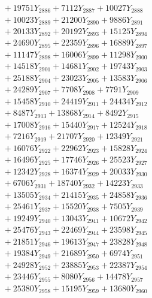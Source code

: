 \documentclass[a4paper,10pt]{article}
\begin{document}
{\begin{align}
&\;  + 19751 Y_{2886} + 7112 Y_{2887} + 10027 Y_{2888} \\[0.3ex]
&\;  + 10023 Y_{2889} + 21200 Y_{2890} + 9886 Y_{2891} \\[0.3ex]
&\;  + 20133 Y_{2892} + 20192 Y_{2893} + 15125 Y_{2894} \\[0.3ex]
&\;  + 24690 Y_{2895} + 22359 Y_{2896} + 16889 Y_{2897} \\[0.3ex]
&\;  + 11147 Y_{2898} + 16006 Y_{2899} + 11298 Y_{2900} \\[0.3ex]
&\;  + 14518 Y_{2901} + 14681 Y_{2902} + 19743 Y_{2903} \\[0.3ex]
&\;  + 25188 Y_{2904} + 23023 Y_{2905} + 13583 Y_{2906} \\[0.3ex]
&\;  + 24289 Y_{2907} + 7708 Y_{2908} + 7791 Y_{2909} \\[0.5ex]\allowbreak
&\;  + 15458 Y_{2910} + 24419 Y_{2911} + 24434 Y_{2912} \\[0.3ex]
&\;  + 8487 Y_{2913} + 13868 Y_{2914} + 8492 Y_{2915} \\[0.3ex]
&\;  + 17008 Y_{2916} + 15440 Y_{2917} + 12524 Y_{2918} \\[0.3ex]
&\;  + 7216 Y_{2919} + 21707 Y_{2920} + 12349 Y_{2921} \\[0.3ex]
&\;  + 16076 Y_{2922} + 22962 Y_{2923} + 15828 Y_{2924} \\[0.3ex]
&\;  + 16496 Y_{2925} + 17746 Y_{2926} + 25523 Y_{2927} \\[0.3ex]
&\;  + 12342 Y_{2928} + 16374 Y_{2929} + 20033 Y_{2930} \\[0.3ex]
&\;  + 6706 Y_{2931} + 18740 Y_{2932} + 14223 Y_{2933} \\[0.3ex]
&\;  + 13505 Y_{2934} + 21415 Y_{2935} + 24858 Y_{2936} \\[0.3ex]
&\;  + 25461 Y_{2937} + 15520 Y_{2938} + 7505 Y_{2939} \\[0.5ex]\allowbreak
&\;  + 19249 Y_{2940} + 13043 Y_{2941} + 10672 Y_{2942} \\[0.3ex]
&\;  + 25476 Y_{2943} + 22469 Y_{2944} + 23598 Y_{2945} \\[0.3ex]
&\;  + 21851 Y_{2946} + 19613 Y_{2947} + 23828 Y_{2948} \\[0.3ex]
&\;  + 19384 Y_{2949} + 21689 Y_{2950} + 6974 Y_{2951} \\[0.3ex]
&\;  + 24928 Y_{2952} + 23885 Y_{2953} + 22387 Y_{2954} \\[0.3ex]
&\;  + 23446 Y_{2955} + 8080 Y_{2956} + 14478 Y_{2957} \\[0.3ex]
&\;  + 25380 Y_{2958} + 15195 Y_{2959} + 13680 Y_{2960} \\[0.3ex]

\end{align}}
\end{document}
